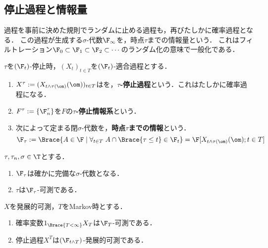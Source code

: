 \documentclass[uplatex,dvipdfmx]{jsreport}
\begin{document}
\subsection{停止過程と情報量}

\begin{tcolorbox}[colframe=ForestGreen, colback=ForestGreen!10!white,breakable,colbacktitle=ForestGreen!40!white,coltitle=black,fonttitle=\bfseries\sffamily,
title=]
    過程を事前に決めた規則でランダムに止める過程も，再びたしかに確率過程となる．
    この過程が生成する$\sigma$-代数$\F_\infty$を，時点$\tau$までの情報量という．
    これはフィルトレーション$\F_0\subset\F_1\subset\F_2\subset\cdots$のランダム化の意味で一般化である．
\end{tcolorbox}

\begin{definition}
    $\tau$を$(\F_t)$-停止時，$(X_t)_{t\in T}$を$(\F_t)$-適合過程とする．
    \begin{enumerate}
        \item $X^\tau:=(X_{t\land\tau(\om)}(\om))_{t\in T}$はを，\textbf{$\tau$-停止過程}という．これはたしかに確率過程になる．
        \item $F^\tau:=\{\F_n^\tau\}$を$F$の\textbf{$\tau$-停止情報系}という．
        \item 次によって定まる閉$\sigma$-代数を，\textbf{時点$\tau$までの情報}という．
        \[\F_\tau:=\Brace{A\in\F\mid\forall_{t\in T}\;A\cap\Brace{\tau\le t}\in\F_t}=\F[X_{t\land\tau(\om)}(\om);t\in T]\]
    \end{enumerate}
\end{definition}

\begin{proposition}[停止時までの情報の性質]
    $\tau,\tau_n,\sigma\in\T$とする．
    \begin{enumerate}
        \item $\F_\tau$は確かに完備な$\sigma$-代数となる．
        \item $\tau$は$\F_\tau$-可測である．
    \end{enumerate}
\end{proposition}

\begin{proposition}[発展的可測性の保存]
    $X$を発展的可測，$T$をMarkov時とする．
    \begin{enumerate}
        \item 確率変数$1_{\Brace{T<\infty}}X_T$は$\F_T$-可測である．
        \item 停止過程$X^T$は$(\F_{t\land T})$-発展的可測である．
    \end{enumerate}
\end{proposition}
\end{document}
